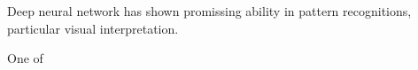 Deep neural network has shown promissing ability in pattern recognitions, particular visual interpretation.
\par 

One of 